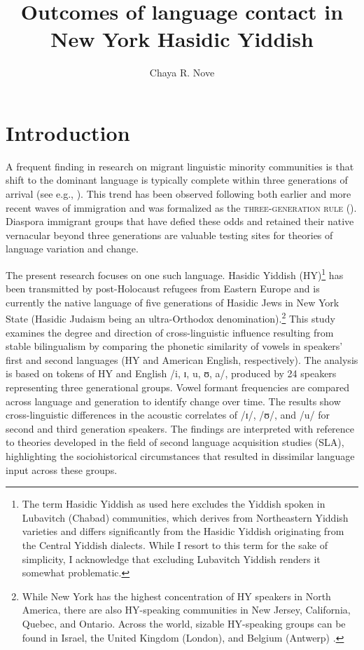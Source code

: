 \documentclass[output=paper]{langsci/langscibook}
\author{Chaya R. Nove\affiliation{Graduate Center, City University of New York}}
\title[Language contact in Hasidic Yiddish]{Outcomes of language contact in New York Hasidic Yiddish}
\begin{document}
\maketitle 



\section{Introduction}
\label{sec:nove:1}

A frequent finding in research on migrant linguistic minority communities is that shift to the dominant language is typically complete within three generations of arrival (see e.g., \citealt{Alba2004, AlbaEtAl2002, RumbautEtAl2006}). This trend has been observed following both earlier and more recent waves of immigration and was formalized as the \textsc{three-generation} \textsc{rule} (\citealt{Fishman1972, Haugen1953}). Diaspora immigrant groups that have defied these odds and retained their native vernacular beyond three generations are valuable testing sites for theories of language variation and change.

The present research focuses on one such language. Hasidic Yiddish (HY)\footnote{The term Hasidic Yiddish as used here excludes the Yiddish spoken in Lubavitch (Chabad) communities, which derives from Northeastern Yiddish varieties and differs significantly from the Hasidic Yiddish originating from the Central Yiddish dialects. While I resort to this term for the sake of simplicity, I acknowledge that excluding Lubavitch Yiddish renders it somewhat problematic.} has been transmitted by post-Holocaust refugees from Eastern Europe and is currently the native language of five generations of Hasidic Jews in New York State (Hasidic Judaism being an ultra-Orthodox denomination).\footnote{While New York has the highest concentration of HY speakers in North America, there are also HY-speaking communities in New Jersey, California, Quebec, and Ontario. Across the world, sizable HY-speaking groups can be found in Israel, the United Kingdom (London), and Belgium (Antwerp) \citep{Assouline2018}.} This study examines the degree and direction of cross-linguistic influence resulting from stable bilingualism by comparing the phonetic similarity of vowels in speakers’ first and second languages (HY and American English, respectively). The analysis is based on tokens of HY and English /i, ɪ, u, ʊ, a/, produced by 24 speakers representing three generational groups. Vowel formant frequencies are compared across language and generation to identify change over time. The results show cross-linguistic differences in the acoustic correlates of /ɪ/, /ʊ/, and /u/ for second and third generation speakers. The findings are interpreted with reference to theories developed in the field of second language acquisition studies (SLA), highlighting the sociohistorical circumstances that resulted in dissimilar language input across these groups. 
\end{document}
